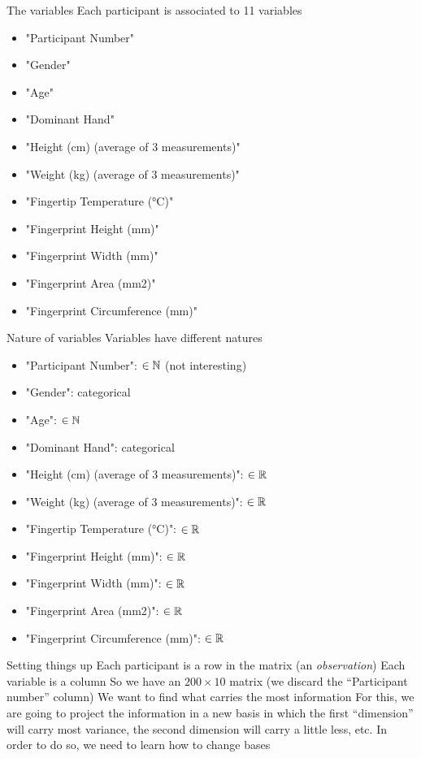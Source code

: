 \documentclass[aspectratio=169]{beamer}\usepackage[]{graphicx}\usepackage[]{xcolor}
\begin{document}
\begin{frame}{The variables}
Each participant is associated to 11 variables
\vfill
\begin{itemize}
\item "Participant Number"
\item "Gender"
\item "Age"
\item "Dominant Hand"
\item "Height (cm) (average of 3 measurements)"
\item "Weight (kg) (average of 3 measurements)"
\item "Fingertip Temperature (°C)"
\item "Fingerprint Height (mm)"
\item "Fingerprint Width (mm)"
\item "Fingerprint Area (mm2)"
\item "Fingerprint Circumference (mm)"
\end{itemize}
\end{frame}

\begin{frame}{Nature of variables}
Variables have different natures
\vfill
\begin{itemize}
\item "Participant Number": $\in\mathbb{N}$ (not interesting)
\item "Gender": categorical
\item "Age": $\in\mathbb{N}$ 
\item "Dominant Hand": categorical
\item "Height (cm) (average of 3 measurements)": $\in\mathbb{R}$
\item "Weight (kg) (average of 3 measurements)": $\in\mathbb{R}$
\item "Fingertip Temperature (°C)": $\in\mathbb{R}$
\item "Fingerprint Height (mm)": $\in\mathbb{R}$
\item "Fingerprint Width (mm)": $\in\mathbb{R}$
\item "Fingerprint Area (mm2)": $\in\mathbb{R}$
\item "Fingerprint Circumference (mm)": $\in\mathbb{R}$
\end{itemize}
\end{frame}

\begin{frame}{Setting things up}
Each participant is a row in the matrix (an \emph{observation})
\vfill
Each variable is a column
\vfill
So we have an $200\times 10$ matrix (we discard the ``Participant number'' column)
\vfill
We want to find what carries the most information
\vfill
For this, we are going to project the information in a new basis in which the first ``dimension'' will carry most variance, the second dimension will carry a little less, etc.
\vfill
In order to do so, we need to learn how to change bases
\end{frame}
\end{document}
